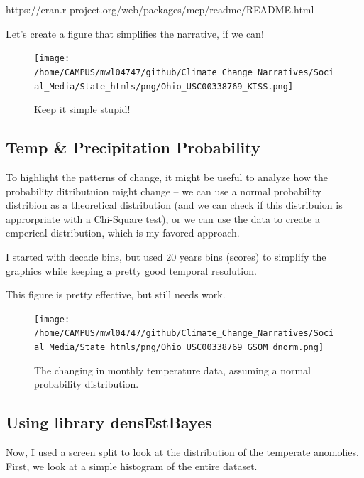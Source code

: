 \documentclass{article}\usepackage[]{graphicx}\usepackage[]{color}
\begin{document}
https://cran.r-project.org/web/packages/mcp/readme/README.html



Let's create a figure that simplifies the narrative, if we can!



\begin{figure}
\texttt{[image: /home/CAMPUS/mwl04747/github/Climate\_Change\_Narratives/Social\_Media/State\_htmls/png/Ohio\_USC00338769\_KISS.png]}
\caption{Keep it simple stupid!}
\label{fig:GSOM-KISS}
\end{figure}

\subsection{Temp \& Precipitation Probability}

To highlight the patterns of change, it might be useful to analyze how the probability ditributuion might change -- we can use a normal probability distribion as a theoretical distribution (and we can check if this distribuion is approrpriate with a Chi-Square test), or we can use the data to create a emperical distribution, which is my favored approach. 

I started with decade bins, but used 20 years bins (scores) to simplify the graphics while keeping a pretty good temporal resolution.



This figure is pretty effective, but still needs work. 

\begin{figure}
\texttt{[image: /home/CAMPUS/mwl04747/github/Climate\_Change\_Narratives/Social\_Media/State\_htmls/png/Ohio\_USC00338769\_GSOM\_dnorm.png]}
\caption{The changing in monthly temperature data, assuming a normal probability distribution.}
\label{fig:GSOM_dnorm}
\end{figure}

\subsection{Using library densEstBayes}

Now, I used a screen split to look at the distribution of the temperate anomolies. First, we look at a simple histogram of the entire dataset. 
\end{document}
